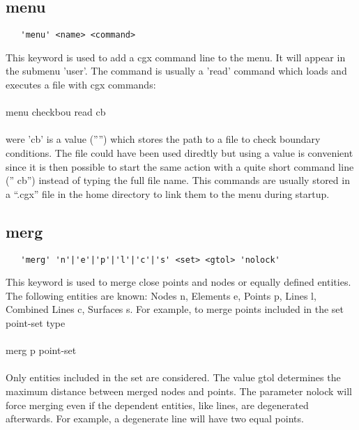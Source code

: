 \documentclass{article}
\begin{document}
\subsection{\label{menu}menu}
\begin{verbatim}
   'menu' <name> <command>
\end{verbatim}
This keyword is used to add a cgx command line to the menu. It will appear in the submenu 'user'. The command is usually a 'read' command which loads and executes a file with cgx commands:\\\\menu checkbou read cb\\\\were 'cb' is a value ('''') which stores the path to a file to check boundary conditions. The file could have been used diredtly but using a value is convenient since it is then possible to start the same action with a quite short command line ('' cb'') instead of typing the full file name. This commands are usually stored in a ``.cgx'' file in the home directory to link them to the menu during startup. 
 
\subsection{\label{merg}merg}
\begin{verbatim}
   'merg' 'n'|'e'|'p'|'l'|'c'|'s' <set> <gtol> 'nolock' 
\end{verbatim}
This keyword is used to merge close points and nodes or equally defined entities. The following entities are known: Nodes n, Elements e, Points p, Lines l, Combined Lines c, Surfaces s. For example, to merge points included in the set point-set type\\\\merg p point-set\\\\Only entities included in the set are considered. The value gtol determines the maximum distance between merged nodes and points. The parameter nolock will force merging even if the dependent entities, like lines, are degenerated afterwards. For example, a degenerate line will have two equal points.
 
\end{document}
